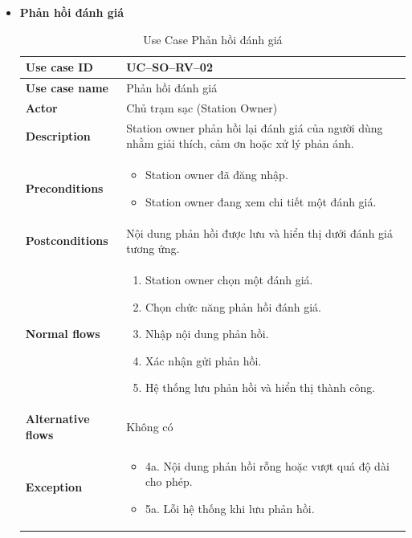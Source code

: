 \begin{enumerate}[label=\textbf{\alph*)}]
\begin{itemize}
  \item \textbf{Phản hồi đánh giá}
    \begin{center}
      \renewcommand{\arraystretch}{1.5}
      \begin{longtable}{|m{}|m{}|}
          \caption{Use Case Phản hồi đánh giá}
        \label{tab:uc_so_rv_02} \\
        \hline
        \textbf{Use case ID} & UC--SO--RV--02 \\
        \hline
        \textbf{Use case name} & Phản hồi đánh giá \\
        \hline
        \textbf{Actor} & Chủ trạm sạc (Station Owner) \\
        \hline
        \textbf{Description} &
        Station owner phản hồi lại đánh giá của người dùng nhằm giải thích, cảm ơn hoặc xử lý phản ánh. \\
        \hline
        \textbf{Preconditions} &
        \begin{itemize}
          \item Station owner đã đăng nhập.
          \item Station owner đang xem chi tiết một đánh giá.
        \end{itemize}\\
        \hline
        \textbf{Postconditions} &
        Nội dung phản hồi được lưu và hiển thị dưới đánh giá tương ứng.\\
        \hline
        \textbf{Normal flows} &
        \begin{enumerate}[label=\arabic*.]
          \item Station owner chọn một đánh giá.
          \item Chọn chức năng phản hồi đánh giá.
          \item Nhập nội dung phản hồi.
          \item Xác nhận gửi phản hồi.
          \item Hệ thống lưu phản hồi và hiển thị thành công.
        \end{enumerate}\\
        \hline
        \textbf{Alternative flows} &
        Không có\\

        \hline
        \textbf{Exception} &
        \begin{itemize}
          \item 4a. Nội dung phản hồi rỗng hoặc vượt quá độ dài cho phép.
          \item 5a. Lỗi hệ thống khi lưu phản hồi.
        \end{itemize}\\
        \hline
        \end{longtable}
    \end{center}
\end{itemize}

\end{enumerate}

